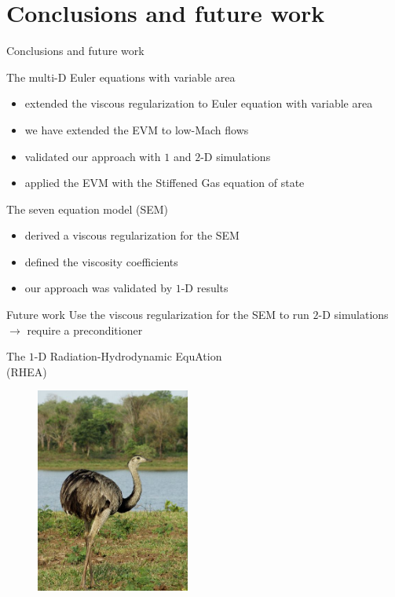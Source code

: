 \documentclass[xcolor=dvipsnames,10pt]{beamer}
\begin{document}
\section{Conclusions and future work}
\begin{frame}{Conclusions and future work}
\begin{block}{The multi-D Euler equations with variable area}
\begin{itemize}
\item extended the viscous regularization to Euler equation with variable area
\item we have extended the EVM to low-Mach flows
\item validated our approach with $1$ and $2$-D simulations
\item applied the EVM with the Stiffened Gas equation of state
\end{itemize}
\end{block}
\begin{block}{The seven equation model (SEM)}
\begin{itemize}
\item derived a viscous regularization for the SEM
\item defined the viscosity coefficients
\item our approach was validated by $1$-D results
\end{itemize}
\end{block}
\begin{block}{Future work}
Use the viscous regularization for the SEM to run $2$-D simulations $\to$ require a preconditioner
\end{block}
\end{frame}
\begin{frame}{}
\begin{center}
The $1$-D Radiation-Hydrodynamic EquAtion \\
(RHEA)
\end{center}
\begin{figure}[H]
\centering
\includegraphics[width=0.45\textwidth]{../figures/rhea.png}
\end{figure}
\end{frame}
\end{document}
